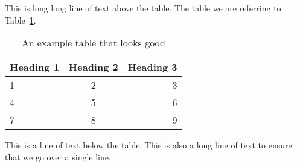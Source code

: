 \documentclass{article}
\begin{document}
\noindent This is long long line of text above the table. The table we are referring to Table~\ref{tab:example_table}.

\begin{table}[h]
  \centering
  \caption{An example table that looks good}\label{tab:example_table}
  \begin{tabular}{l c r}
    \toprule
    Heading 1 & Heading 2 & Heading 3 \\
    \midrule
    1 & 2 & 3 \\
    4 & 5 & 6 \\
    7 & 8 & 9 \\
    \bottomrule
  \end{tabular}
\end{table}

\noindent This is a line of text below the table. This is also a long line of text to ensure that we go over a single line.
\end{document}
